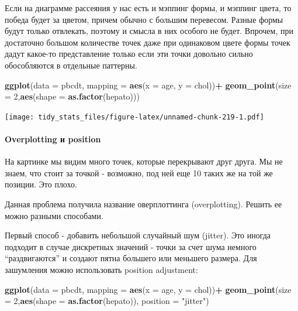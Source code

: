 \documentclass[]{book}
\newenvironment{Shaded}{\begin{snugshade}}{\end{snugshade}}
\newcommand{\KeywordTok}[1]{\textcolor[rgb]{0.13,0.29,0.53}{\textbf{#1}}}
\newcommand{\DataTypeTok}[1]{\textcolor[rgb]{0.13,0.29,0.53}{#1}}
\newcommand{\DecValTok}[1]{\textcolor[rgb]{0.00,0.00,0.81}{#1}}
\newcommand{\StringTok}[1]{\textcolor[rgb]{0.31,0.60,0.02}{#1}}
\newcommand{\OperatorTok}[1]{\textcolor[rgb]{0.81,0.36,0.00}{\textbf{#1}}}
\newcommand{\NormalTok}[1]{#1}
\let\oldparagraph\paragraph
\renewcommand{\paragraph}[1]{\oldparagraph{#1}\mbox{}}
\begin{document}
Если на диаграмме рассеяния у нас есть и мэппинг формы, и мэппинг цвета,
то победа будет за цветом, причем обычно с большим перевесом. Разные
формы будут только отвлекать, поэтому и смысла в них особого не будет.
Впрочем, при достаточно большом количестве точек даже при одинаковом
цвете формы точек дадут какое-то представление только если эти точки
довольно сильно обособляются в отдельные паттерны.

\begin{Shaded}
\begin{Highlighting}[]
\KeywordTok{ggplot}\NormalTok{(}\DataTypeTok{data =}\NormalTok{ pbcdt, }\DataTypeTok{mapping =} \KeywordTok{aes}\NormalTok{(}\DataTypeTok{x =}\NormalTok{ age, }\DataTypeTok{y =}\NormalTok{ chol))}\OperatorTok{+}
\StringTok{  }\KeywordTok{geom_point}\NormalTok{(}\DataTypeTok{size =} \DecValTok{2}\NormalTok{,}\KeywordTok{aes}\NormalTok{(}\DataTypeTok{shape =} \KeywordTok{as.factor}\NormalTok{(hepato)))}
\end{Highlighting}
\end{Shaded}

\texttt{[image: tidy\_stats\_files/figure-latex/unnamed-chunk-219-1.pdf]}

\paragraph{Overplotting и position}\label{overplotting-ux438-position}

На картинке мы видим много точек, которые перекрывают друг друга. Мы не
знаем, что стоит за точкой - возможно, под ней еще 10 таких же на той же
позиции. Это плохо.

Данная проблема получила название оверплоттинга (overplotting). Решить
ее можно разными способами.

Первый способ - добавить небольшой случайный шум (jitter). Это иногда
подходит в случае дискретных значений - точки за счет шума немного
``раздвигаются'' и создают пятна большего или меньшего размера. Для
зашумления можно использовать position adjustment:

\begin{Shaded}
\begin{Highlighting}[]
\KeywordTok{ggplot}\NormalTok{(}\DataTypeTok{data =}\NormalTok{ pbcdt, }\DataTypeTok{mapping =} \KeywordTok{aes}\NormalTok{(}\DataTypeTok{x =}\NormalTok{ age, }\DataTypeTok{y =}\NormalTok{ chol))}\OperatorTok{+}
\StringTok{  }\KeywordTok{geom_point}\NormalTok{(}\DataTypeTok{size =} \DecValTok{2}\NormalTok{,}\KeywordTok{aes}\NormalTok{(}\DataTypeTok{shape =} \KeywordTok{as.factor}\NormalTok{(hepato)), }\DataTypeTok{position =} \StringTok{"jitter"}\NormalTok{)}
\end{Highlighting}
\end{Shaded}
\end{document}

